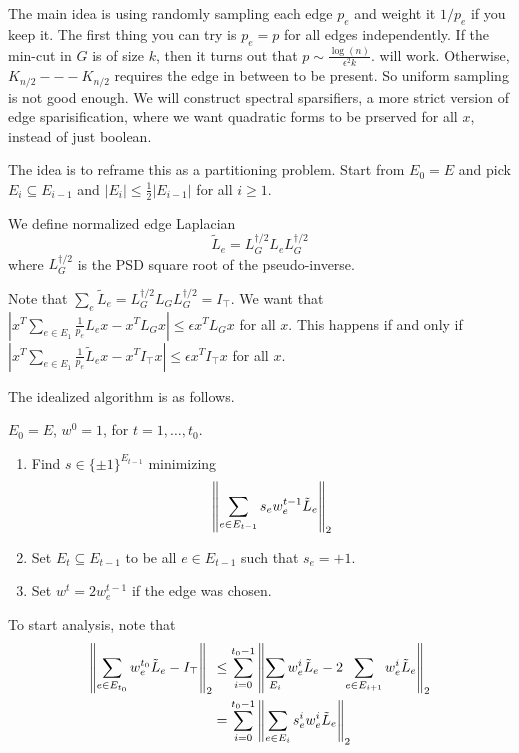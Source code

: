 The main idea is using
randomly sampling each edge $p_e$ and weight it $1/p_e$ if you keep it.
The first thing you can try is $p_e = p$ for all edges independently.
If the min-cut in $G$ is of size $k$, then it turns out that $p \sim \frac{\log(n)}{\epsilon^2 k}$.
will work. Otherwise, $K_{n/2} --- K_{n/2}$ requires the edge in between to be present.
So uniform sampling is not good enough. We will construct spectral sparsifiers, a more
strict version of edge sparisification, where we want quadratic forms to be prserved for all $x$,
instead of just boolean.


The idea is to reframe this as a partitioning problem.
Start from $E_0 = E$ and pick 
$E_i \subseteq E_{i - 1}$ and $|E_i| \le \frac{1}{2} |E_{i - 1}|$ for all $i \ge 1$.
\begin{definition}
    We define normalized edge Laplacian
    \[ \tilde{L}_e = L_G^{\dagger/2}  L_e L_G^{\dagger/2}\]
    where $L_G^{\dagger/2}$ is the PSD square root of the pseudo-inverse.
\end{definition}
Note that $\sum_e \tilde{L}_e = L_G^{\dagger/2} L_G L_G^{\dagger/2} = I_{\top}$.
We want that $\left|x^T \sum_{e \in E_1} \frac{1}{p_e} L_e x - x^T L_G x \right| \le \epsilon x^T L_G x$ for all $x$.
This happens if and only if $\left|x^T \sum_{e \in E_1} \frac{1}{p_e} \tilde{L}_e x - x^T I_{\top} x \right| \le \epsilon x^T I_{\top} x$
for all $x$.

The idealized algorithm is as follows.
\begin{algothm}
$E_0= E$, $w^0 = 1$, for $t = 1, \dots, t_0$.
\begin{enumerate}
    \item Find $s \in \{\pm 1\}^{E_{t - 1}}$ minimizing
    \[ \norm{\sum_{e \in E_{t - 1}} s_e w_e^{t - 1} \tilde{L}_e}_2 \]
    \item Set $E_t \subseteq E_{t - 1}$
    to be all $e \in E_{t - 1}$ such that $s_e = +1$.
    \item Set $w^t = 2w_e^{t - 1}$ if the edge was chosen.
\end{enumerate}
\end{algothm}

To start analysis, note that
\begin{align*}
    \norm{\sum_{e \in E_{t_0}} w_e^{t_0} \tilde{L}_e - I_{\top}}_2 &\le \sum_{i = 0}^{t_0 - 1} \norm{\sum_{E_i} w_e^{i} \tilde{L}_e - 2\sum_{e \in E_{i + 1}} w_e^i \tilde{L}_e }_2 \\
    &= \sum_{i = 0}^{t_0 - 1} \norm{\sum_{e \in E_i} s_e^i w_e^i \tilde{L}_e}_2 \\
\end{align*}

